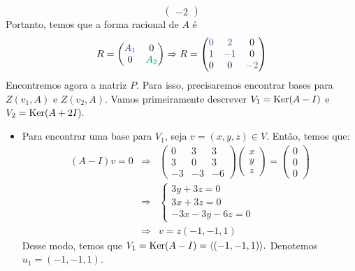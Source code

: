 \documentclass[11pt,a4paper]{article}
\begin{document}
{\[\begin{pmatrix}
-2 \end{pmatrix}
\]
Portanto, temos que a forma racional de $A$ é
\[
R = \begin{pmatrix}
\textcolor{Violet}{A_1} & 0 \\ 0 & \textcolor{PineGreen}{A_2}
\end{pmatrix} \Rightarrow R = \begin{pmatrix}
\textcolor{Violet}{0} & \textcolor{Violet}{2} & 0 \\ \textcolor{Violet}{1} & \textcolor{Violet}{-1} & 0 \\
0 & 0 & \textcolor{PineGreen}{-2}
\end{pmatrix} 
\]
Encontremos agora a matriz $P.$ Para isso, precisaremos encontrar bases para $Z(v_1, A)$ e $Z(v_2, A).$ 
Vamos primeiramente descrever $V_1 = \operatorname{Ker}(A - I)$ e $V_2 = \operatorname{Ker}(A + 2I).$ 
\begin{itemize}
\item Para encontrar uma base para $V_1$, seja $v = (x, y, z) \in V.$ Então, temos que:
\[
\begin{array}{rcl}
(A - I)v = 0 &\Rightarrow& \begin{pmatrix}
0 & 3 & 3 \\
3 & 0 & 3 \\
-3 & -3 & -6
\end{pmatrix} \begin{pmatrix}
x \\ y \\ z
\end{pmatrix} = \begin{pmatrix}
0 \\ 0 \\ 0
\end{pmatrix} \\&\Rightarrow& \begin{cases}
3y + 3z = 0 \\
3x+3z = 0 \\
-3x-3y-6z = 0
\end{cases} \\&\Rightarrow& v = z (-1,-1,1)
\end{array}
\]
Desse modo, temos que $V_1 = \operatorname{Ker}(A - I) = \langle (-1,-1,1) \rangle.$ Denotemos $u_1 = (-1,-1,1).$


\end{itemize}}
\end{document}
